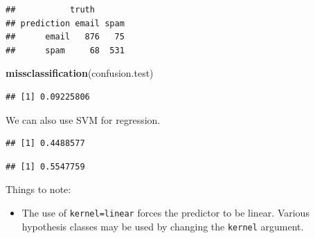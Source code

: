 \documentclass[]{book}
\newenvironment{Shaded}{\begin{snugshade}}{\end{snugshade}}
\newcommand{\CommentTok}[1]{\textcolor[rgb]{0.56,0.35,0.01}{\textit{#1}}}
\newcommand{\DataTypeTok}[1]{\textcolor[rgb]{0.13,0.29,0.53}{#1}}
\newcommand{\FloatTok}[1]{\textcolor[rgb]{0.00,0.00,0.81}{#1}}
\newcommand{\KeywordTok}[1]{\textcolor[rgb]{0.13,0.29,0.53}{\textbf{#1}}}
\newcommand{\NormalTok}[1]{#1}
\newcommand{\OperatorTok}[1]{\textcolor[rgb]{0.81,0.36,0.00}{\textbf{#1}}}
\newcommand{\StringTok}[1]{\textcolor[rgb]{0.31,0.60,0.02}{#1}}
\providecommand{\tightlist}{%
  \setlength{\itemsep}{0pt}\setlength{\parskip}{0pt}}
\theoremstyle{definition}
\theoremstyle{definition}
\theoremstyle{definition}
\theoremstyle{remark}
\begin{document}
\begin{verbatim}
##           truth
## prediction email spam
##      email   876   75
##      spam     68  531
\end{verbatim}

\begin{Shaded}
\begin{Highlighting}[]
\KeywordTok{missclassification}\NormalTok{(confusion.test)}
\end{Highlighting}
\end{Shaded}

\begin{verbatim}
## [1] 0.09225806
\end{verbatim}

We can also use SVM for regression.

\begin{Shaded}
\end{Shaded}

\begin{verbatim}
## [1] 0.4488577
\end{verbatim}

\begin{Shaded}
\end{Shaded}

\begin{verbatim}
## [1] 0.5547759
\end{verbatim}

Things to note:

\begin{itemize}
\tightlist
\item
  The use of \texttt{kernel=\textquotesingle{}linear\textquotesingle{}} forces the predictor to be linear. Various hypothesis classes may be used by changing the \texttt{kernel} argument.
\end{itemize}
\end{document}
